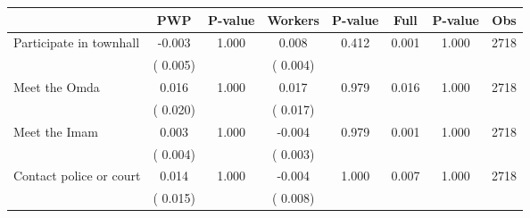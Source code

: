 
\begin{tabular}{l*{7}{c}}\hline&\multicolumn{1}{c}{PWP}&\multicolumn{1}{c}{P-value}&\multicolumn{1}{c}{Workers}&\multicolumn{1}{c}{P-value}&\multicolumn{1}{c}{Full}&\multicolumn{1}{c}{P-value}&\multicolumn{1}{c}{Obs} \\ \hline

 Participate in townhall       &             -0.003       &        1.000  &              0.008       &        0.412  &              0.001       &              1.000 &  2718 \\ 
                       &       (       0.005)             &                               &       (       0.004)                     &                               &                                               &                                &                      \\ 

 Meet the Omda       &              0.016       &        1.000  &              0.017       &        0.979  &              0.016       &              1.000 &  2718 \\ 
                       &       (       0.020)             &                               &       (       0.017)                     &                               &                                               &                                &                      \\ 

 Meet the Imam       &              0.003       &        1.000  &             -0.004       &        0.979  &              0.001       &              1.000 &  2718 \\ 
                       &       (       0.004)             &                               &       (       0.003)                     &                               &                                               &                                &                      \\ 

 Contact police or court       &              0.014       &        1.000  &             -0.004       &        1.000  &              0.007       &              1.000 &  2718 \\ 
                       &       (       0.015)             &                               &       (       0.008)                     &                               &                                               &                                &                      \\ 


\end{tabular}
